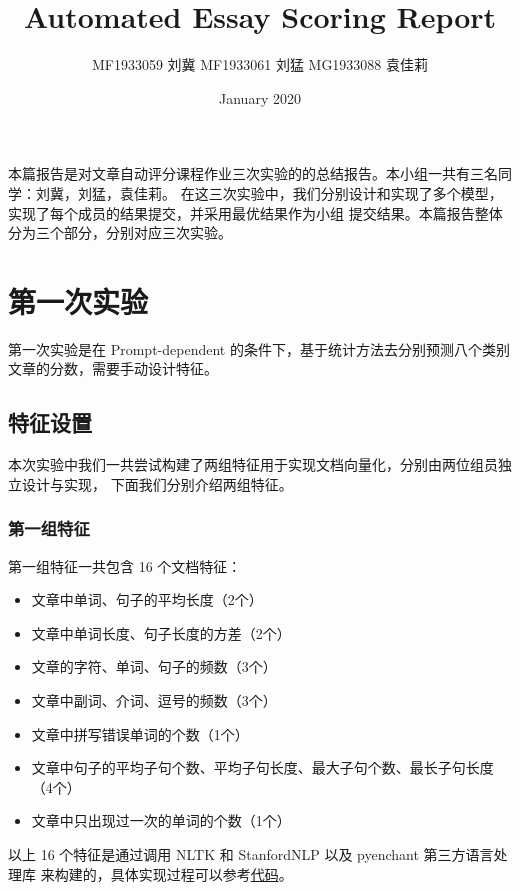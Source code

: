 \documentclass[UTF8]{article}
\begin{document}
\title{Automated Essay Scoring Report}
\author{MF1933059 刘冀 MF1933061 刘猛 MG1933088 袁佳莉}
\date{January 2020}
\maketitle

本篇报告是对文章自动评分课程作业三次实验的的总结报告。本小组一共有三名同学：刘冀，刘猛，袁佳莉。
在这三次实验中，我们分别设计和实现了多个模型，实现了每个成员的结果提交，并采用最优结果作为小组
提交结果。本篇报告整体分为三个部分，分别对应三次实验。

\section{第一次实验}

第一次实验是在 Prompt-dependent 的条件下，基于统计方法去分别预测八个类别文章的分数，需要手动设计特征。

\subsection{特征设置}

本次实验中我们一共尝试构建了两组特征用于实现文档向量化，分别由两位组员独立设计与实现，
下面我们分别介绍两组特征。

\subsubsection{第一组特征}

第一组特征一共包含 16 个文档特征：
\begin{itemize}
    \item 文章中单词、句子的平均长度（2个）
    \item 文章中单词长度、句子长度的方差（2个）
    \item 文章的字符、单词、句子的频数（3个）
    \item 文章中副词、介词、逗号的频数（3个）
    \item 文章中拼写错误单词的个数（1个）
    \item 文章中句子的平均子句个数、平均子句长度、最大子句个数、最长子句长度（4个）
    \item 文章中只出现过一次的单词的个数（1个）
\end{itemize}

以上 16 个特征是通过调用 NLTK 和 StanfordNLP 以及 pyenchant 第三方语言处理库
来构建的，具体实现过程可以参考\href{https://github.com/Mandule/EssayAE/tree/master/HW1}{代码}。
\end{document}
